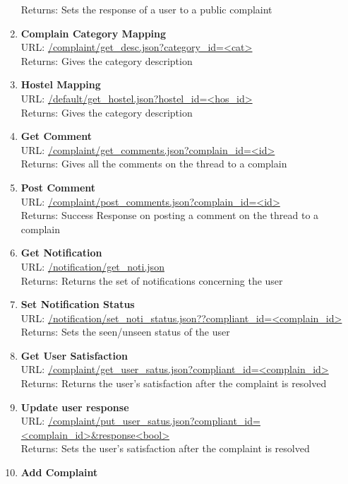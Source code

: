 \documentclass{article}
\begin{document}
\begin{enumerate}
						Returns:  Sets the response of a user to a public complaint 
					\item \textbf{Complain Category Mapping} \\
						URL: \url{/complaint/get_desc.json?category_id=<cat>}\\
						Returns:  Gives the category description 
					\item \textbf{Hostel Mapping} \\
						URL: \url{/default/get_hostel.json?hostel_id=<hos_id>}\\
						Returns:  Gives the category description 
					\item \textbf{Get Comment} \\
						URL: \url{/complaint/get_comments.json?complain_id=<id>}\\
						Returns:  Gives all the comments on the thread to a complain
					\item \textbf{Post Comment} \\
						URL: \url{/complaint/post_comments.json?complain_id=<id>}\\
						Returns:  Success Response on posting a comment on the thread to a complain
					\item \textbf{Get Notification} \\
						URL: \url{/notification/get_noti.json}\\
						Returns: Returns the set of notifications concerning the user
					\item \textbf{Set Notification Status} \\
						URL: \url{/notification/set_noti_status.json??compliant_id=<complain_id>}\\
						Returns: Sets the seen/unseen status of the user
					\item \textbf{Get User Satisfaction} \\
						URL: \url{/complaint/get_user_satus.json?compliant_id=<complain_id>}\\
						Returns: Returns the user's satisfaction after the complaint is resolved
					\item \textbf{Update user response} \\
						URL: \url{/complaint/put_user_satus.json?compliant_id=<complain_id>&response<bool>}\\
						Returns: Sets the user's satisfaction after the complaint is resolved
					\item \textbf{Add Complaint} \\

\end{enumerate}
\end{document}
